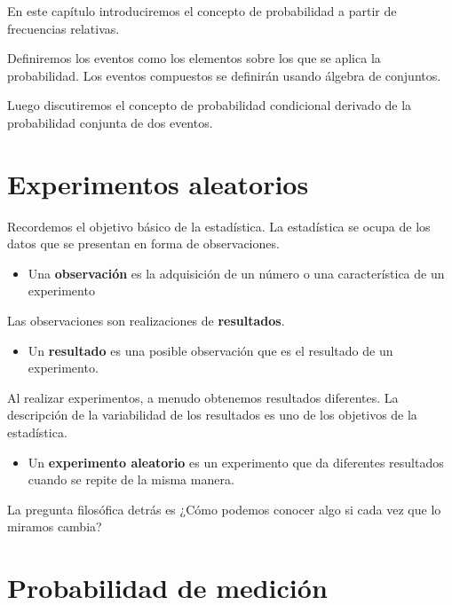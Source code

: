\documentclass[
]{book}
\providecommand{\tightlist}{%
  \setlength{\itemsep}{0pt}\setlength{\parskip}{0pt}}
\begin{document}
En este capítulo introduciremos el concepto de probabilidad a partir de frecuencias relativas.

Definiremos los eventos como los elementos sobre los que se aplica la probabilidad. Los eventos compuestos se definirán usando álgebra de conjuntos.

Luego discutiremos el concepto de probabilidad condicional derivado de la probabilidad conjunta de dos eventos.

\hypertarget{experimentos-aleatorios-1}{%
\section{Experimentos aleatorios}\label{experimentos-aleatorios-1}}

Recordemos el objetivo básico de la estadística. La estadística se ocupa de los datos que se presentan en forma de observaciones.

\begin{itemize}
\tightlist
\item
  Una \textbf{observación} es la adquisición de un número o una característica de un experimento
\end{itemize}

Las observaciones son realizaciones de \textbf{resultados}.

\begin{itemize}
\tightlist
\item
  Un \textbf{resultado} es una posible observación que es el resultado de un experimento.
\end{itemize}

Al realizar experimentos, a menudo obtenemos resultados diferentes. La descripción de la variabilidad de los resultados es uno de los objetivos de la estadística.

\begin{itemize}
\tightlist
\item
  Un \textbf{experimento aleatorio} es un experimento que da diferentes resultados cuando se repite de la misma manera.
\end{itemize}

La pregunta filosófica detrás es ¿Cómo podemos conocer algo si cada vez que lo miramos cambia?

\hypertarget{probabilidad-de-mediciuxf3n}{%
\section{Probabilidad de medición}\label{probabilidad-de-mediciuxf3n}}
\end{document}

